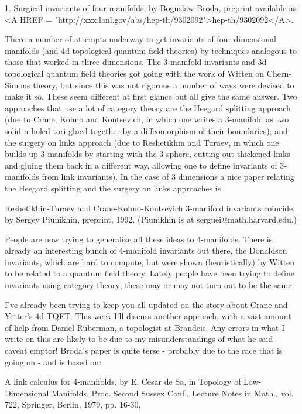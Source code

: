 

1. Surgical invariants of four-manifolds, by Boguslaw Broda, preprint
available as <A HREF = "http://xxx.lanl.gov/abs/hep-th/9302092">hep-th/9302092</A>.

There a number of attempts underway to get invariants of four-dimensional
manifolds (and 4d topological quantum field theories) by techniques
analogous to those that worked in three dimensions.  The 3-manifold
invariants and 3d topological quantum field theories got going with the
work of Witten on Chern-Simons theory, but since this was not rigorous a
number of ways were devised to make it so.  These seem different at
first glance but all give the same answer.  Two approaches that use a
lot of category theory are the Heegard splitting approach (due to Crane,
Kohno and Kontsevich, in which one writes a 3-manifold as two solid
n-holed tori glued together by a diffeomorphism of their boundaries),
and the surgery on links approach (due to Reshetikhin and Turaev, in
which one builds up 3-manifolds by starting with the 3-sphere, cutting out
thickened links and gluing them back in a different way, allowing one to define
invariants of 3-manifolds from link invariants).  In the case of 3
dimensions a nice paper relating the Heegard splitting and the surgery
on links approaches is

Reshetikhin-Turaev and Crane-Kohno-Kontsevich 3-manifold invariants
coincide, by Sergey Piunikhin, preprint, 1992.  (Piunikhin is at
serguei@math.harvard.edu.)  

People are now trying to generalize all these ideas to 4-manifolds.
There is already an interesting bunch of 4-manifold invariants out
there, the Donaldson invariants, which are hard to compute, but were
shown (heuristically) by Witten to be related to a quantum field theory.
Lately people have been trying to define invariants using category
theory; these may or may not turn out to be the same.

I've already been trying to keep you all updated on the story about Crane and
Yetter's 4d TQFT.   This week I'll discuss another approach, with a vast
amount of help from Daniel Ruberman, a topologist at Brandeis.  Any
errors in what I write on this are likely to be due to my
misunderstandings of what he said - caveat emptor!  Broda's paper is
quite terse - probably due to the race that is going on - and is based
on:

A link calculus for 4-manifolds, by E. Cesar de Sa, in Topology of
Low-Dimensional Manifolds, Proc. Second Sussex Conf., Lecture Notes in
Math., vol. 722, Springer, Berlin, 1979, pp. 16-30,

